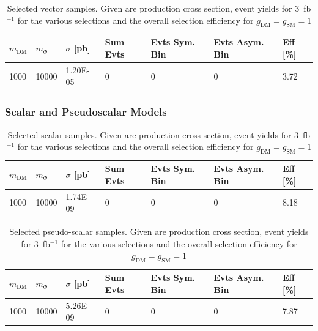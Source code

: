 \begin{table}[h!]
\small
\centering
\begin{tabular}{lllllll}
\hline
$m_\textrm{DM}$ & $m_\Phi$             & $\sigma$ [pb] & Sum Evts       & Evts Sym. Bin & Evts Asym. Bin & Eff  [\%]   \\\hline
1000 & 10000 & 1.20E-05 & 0        & 0        & 0        & 3.72 \\
\hline
\end{tabular}
\caption{Selected vector samples. Given are production cross section, event yields for 3~fb$^{-1 }$ for the various selections and the overall selection efficiency for $g_\textrm{DM}=g_\textrm{SM}=1$}
\label{tab:dm_V_g1_3fb}
\end{table}




\clearpage
\subsubsection{Scalar and Pseudoscalar Models} \label{sec:dm_pscalar}

\begin{table}[h!]
\small
\centering
\begin{tabular}{lllllll}
\hline
$m_\textrm{DM}$ & $m_\Phi$ & $\sigma$ [pb] & Sum Evts       & Evts Sym. Bin & Evts Asym. Bin & Eff  [\%]   \\\hline
1000  &  10000 & 1.74E-09 & 0      & 0      & 0      & 8.18 \\

\hline
\end{tabular}
\caption{Selected scalar samples. Given are production cross section, event yields for 3~fb$^{-1 }$ for the various selections and the overall selection efficiency for $g_\textrm{DM}=g_\textrm{SM}=1$}
\label{tab:dm_S_g1_3fb}
\end{table}


\begin{table}[h!]
\small
\centering
\begin{tabular}{lllllll}
\hline
$m_\textrm{DM}$ & $m_\Phi$             & $\sigma$ [pb] & Sum Evts       & Evts Sym. Bin & Evts Asym. Bin & Eff  [\%]   \\\hline
1000  & 10000 & 5.26E-09 & 0       & 0      & 0       & 7.87 \\

\hline
\end{tabular}
\caption{Selected pseudo-scalar samples. Given are production cross section, event yields for 3~fb$^{-1 }$ for the various selections and the overall selection efficiency for $g_\textrm{DM}=g_\textrm{SM}=1$}
\label{tab:dm_P_g1_3fb}
\end{table}



